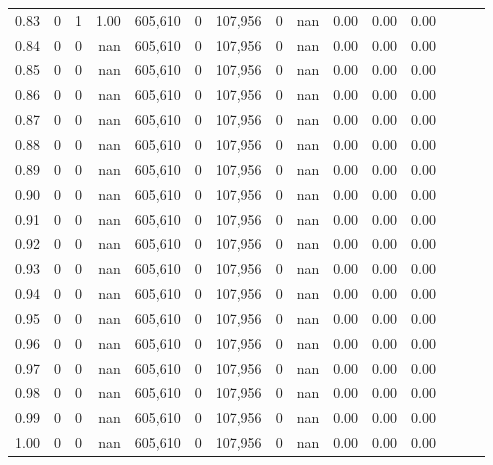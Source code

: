 \begin{tabular}{rrrrrrrrrrrrrrr}
0.83 &       0 &      1 &  1.00 &  605,610 &        0 &  107,956 &        0 &   nan &  0.00 &  0.00 &      0.00 \\
0.84 &       0 &      0 &   nan &  605,610 &        0 &  107,956 &        0 &   nan &  0.00 &  0.00 &      0.00 \\
0.85 &       0 &      0 &   nan &  605,610 &        0 &  107,956 &        0 &   nan &  0.00 &  0.00 &      0.00 \\
0.86 &       0 &      0 &   nan &  605,610 &        0 &  107,956 &        0 &   nan &  0.00 &  0.00 &      0.00 \\
0.87 &       0 &      0 &   nan &  605,610 &        0 &  107,956 &        0 &   nan &  0.00 &  0.00 &      0.00 \\
0.88 &       0 &      0 &   nan &  605,610 &        0 &  107,956 &        0 &   nan &  0.00 &  0.00 &      0.00 \\
0.89 &       0 &      0 &   nan &  605,610 &        0 &  107,956 &        0 &   nan &  0.00 &  0.00 &      0.00 \\
0.90 &       0 &      0 &   nan &  605,610 &        0 &  107,956 &        0 &   nan &  0.00 &  0.00 &      0.00 \\
0.91 &       0 &      0 &   nan &  605,610 &        0 &  107,956 &        0 &   nan &  0.00 &  0.00 &      0.00 \\
0.92 &       0 &      0 &   nan &  605,610 &        0 &  107,956 &        0 &   nan &  0.00 &  0.00 &      0.00 \\
0.93 &       0 &      0 &   nan &  605,610 &        0 &  107,956 &        0 &   nan &  0.00 &  0.00 &      0.00 \\
0.94 &       0 &      0 &   nan &  605,610 &        0 &  107,956 &        0 &   nan &  0.00 &  0.00 &      0.00 \\
0.95 &       0 &      0 &   nan &  605,610 &        0 &  107,956 &        0 &   nan &  0.00 &  0.00 &      0.00 \\
0.96 &       0 &      0 &   nan &  605,610 &        0 &  107,956 &        0 &   nan &  0.00 &  0.00 &      0.00 \\
0.97 &       0 &      0 &   nan &  605,610 &        0 &  107,956 &        0 &   nan &  0.00 &  0.00 &      0.00 \\
0.98 &       0 &      0 &   nan &  605,610 &        0 &  107,956 &        0 &   nan &  0.00 &  0.00 &      0.00 \\
0.99 &       0 &      0 &   nan &  605,610 &        0 &  107,956 &        0 &   nan &  0.00 &  0.00 &      0.00 \\
1.00 &       0 &      0 &   nan &  605,610 &        0 &  107,956 &        0 &   nan &  0.00 &  0.00 &      0.00 \\
\bottomrule
\end{tabular}
